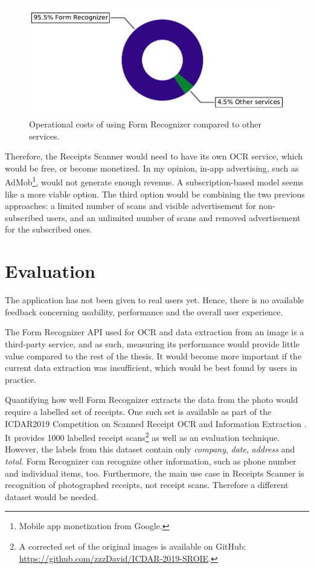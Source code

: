 \documentclass[
  printed, %
  table,   %
  oneside, %
  lof,     %
  lot,     %
]{fithesis3}
\begin{document}
\begin{figure}
    \begin{center}
        \includegraphics[width=1\textwidth]{figures/graphs/operational_costs}
    \end{center}
    \caption{Operational costs of using Form Recognizer compared to other services.}
    \label{fig:operational_costs}
\end{figure}

Therefore, the Receipts Scanner would need to have its own OCR service, which would be free, or become monetized. In my opinion, in-app advertising, such as AdMob\footnote{Mobile app monetization from Google.}, would not generate enough revenue. A subscription-based model seems like a more viable option. The third option would be combining the two previous approaches: a limited number of scans and visible advertisement for non-subscribed users, and an unlimited number of scans and removed advertisement for the subscribed ones.

\chapter{Evaluation}
The application has not been given to real users yet. Hence, there is no available feedback concerning usability, performance and the overall user experience.

The Form Recognizer API used for OCR and data extraction from an image is a third-party service, and as such, measuring its performance would provide little value compared to the rest of the thesis. It would become more important if the current data extraction was insufficient, which would be best found by users in practice.

Quantifying how well Form Recognizer extracts the data from the photo would require a labelled set of receipts. One such set is available as part of the ICDAR2019 Competition on Scanned Receipt OCR
and Information Extraction \cite{Huang2019ICDAR}. It provides \num{1000} labelled receipt scans\footnote{A corrected set of the original images is available on GitHub: \url{https://github.com/zzzDavid/ICDAR-2019-SROIE}.} as well as an evaluation technique. However, the labels from this dataset contain only \textit{company}, \textit{date}, \textit{address} and \textit{total}. Form Recognizer can recognize other information, such as phone number and individual items, too. Furthermore, the main use case in Receipts Scanner is recognition of photographed receipts, not receipt scans. Therefore a different dataset would be needed.
\end{document}
